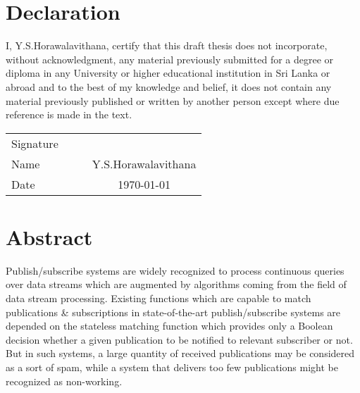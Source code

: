 \documentclass[a4paper,12pt,oneside]{book}
\theoremstyle{definition}
\theoremstyle{remark}
\begin{document}
\setcounter{page}{1}

\newpage
\pagestyle{plain}
\setcounter{page}{1}

\section*{Declaration}
I, Y.S.Horawalavithana, certify that this draft thesis does not incorporate, without acknowledgment, any material previously submitted for a degree or diploma in any University or higher educational institution in Sri Lanka or abroad and to the best of my knowledge and belief, it does not contain
any material previously published or written by another person except where due reference is made in the text.\\
\begin{center}
    \begin{tabular}{l p{0.4in} @{:} p{0.3in} c}
      Signature & & & \\ \cline{4-4}
      Name & & & Y.S.Horawalavithana \\ \cline{4-4}
      Date & & & \today \\ \cline{4-4}
    \end{tabular}
  \end{center}


\newpage
\section*{Abstract}
Publish/subscribe systems are widely recognized to process continuous queries over data streams which are augmented by algorithms coming from the field of data stream processing. Existing functions which are capable to match publications \& subscriptions in state-of-the-art publish/subscribe
systems are depended on the stateless matching function which provides only a Boolean decision whether a given publication to be notified to relevant subscriber or not. But in such systems, a large quantity of received publications may be considered as a sort of spam, while a system that delivers too few publications might be recognized as non-working. 
\end{document}

